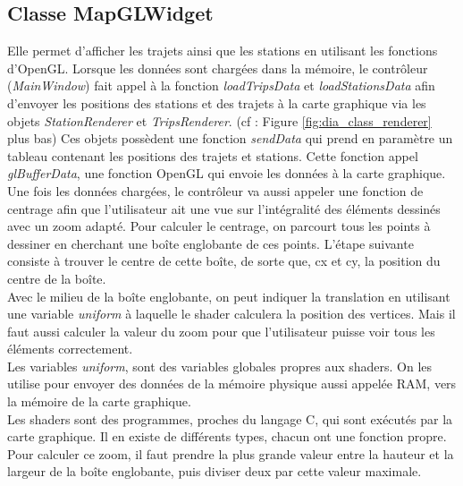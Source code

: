 \documentclass[12pt]{article}
\begin{document}
		\subsection{Classe MapGLWidget}
		Elle permet d’afficher les trajets ainsi que les stations en utilisant les fonctions d’OpenGL. Lorsque les données sont chargées dans la mémoire, le contrôleur (\textit{MainWindow}) fait appel à la fonction \textit{loadTripsData} et \textit{loadStationsData} afin d’envoyer les positions des stations et des trajets à la carte graphique via les objets \textit{StationRenderer} et \textit{TripsRenderer}. (cf : Figure \ref{fig:dia_class_renderer} plus bas) Ces objets possèdent une fonction \textit{sendData} qui prend en paramètre
		un tableau contenant les positions des trajets et stations. Cette fonction appel 
		\textit{glBufferData}, une fonction OpenGL qui envoie les données à la carte graphique.\\

		Une fois les données chargées, le contrôleur va aussi appeler une fonction de centrage afin que l’utilisateur ait une vue sur l’intégralité des éléments dessinés avec un zoom adapté.
Pour calculer le centrage, on parcourt tous les points à dessiner en cherchant une boîte englobante de ces points. L’étape suivante consiste à trouver le centre de cette boîte, de sorte que, cx et cy, la position du centre de la boîte.\\

	Avec le milieu de la boîte englobante, on peut indiquer la translation en utilisant une variable
	\textit{uniform} à laquelle le shader calculera la position des vertices. Mais il faut aussi calculer la valeur du zoom pour que l’utilisateur puisse voir tous les éléments correctement.\\
	
	Les variables \textit{uniform}, sont des variables globales propres aux shaders. On les utilise
	pour envoyer des données de la mémoire physique aussi appelée RAM, vers la mémoire de la carte
	graphique.\\
	
	Les shaders sont des programmes, proches du langage C, qui sont exécutés par la carte graphique. Il
	en existe de différents types, chacun ont une fonction propre.\\

	Pour calculer ce zoom, il faut prendre la plus grande valeur entre la hauteur et la largeur de la boîte englobante, puis diviser deux par cette valeur maximale.\\
\end{document}

